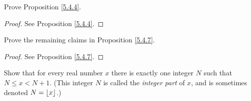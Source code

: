 \exercisesection

\begin{exercise}\label{ex 5.4.1}
    Prove Proposition \ref{5.4.4}.
\end{exercise}

\begin{proof}
    See Proposition \ref{5.4.4}.
\end{proof}

\begin{exercise}\label{ex 5.4.2}
    Prove the remaining claims in Proposition \ref{5.4.7}.
\end{exercise}

\begin{proof}
    See Proposition \ref{5.4.7}.
\end{proof}

\begin{exercise}\label{ex 5.4.3}
    Show that for every real number \(x\) there is exactly one integer \(N\) such that \(N \leq x < N + 1\).
    (This integer \(N\) is called the \emph{integer part} of \(x\), and is sometimes denoted \(N = \floor*{x}\).)
\end{exercise}


